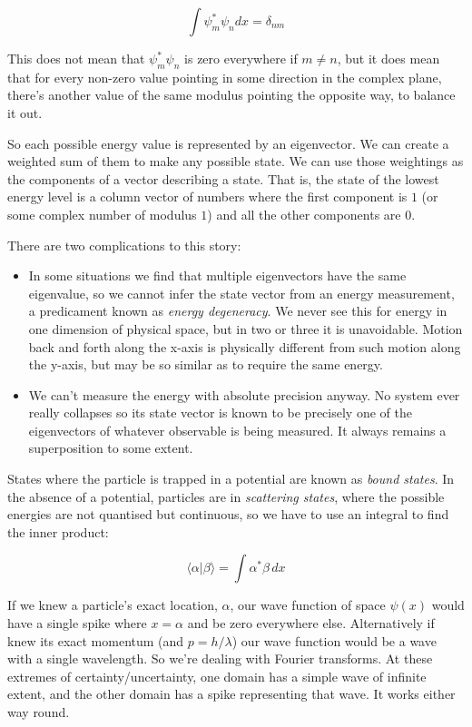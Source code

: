 $$
\int
\psi_m^* \psi_n dx = \delta_{nm}
$$

This does not mean that $\psi_m^* \psi_n$ is zero everywhere if $m \ne n$, but it does mean that for every non-zero value pointing in some direction in the complex plane, there's another value of the same modulus pointing the opposite way, to balance it out.

So each possible energy value is represented by an eigenvector. We can create a weighted sum of them to make any possible state. We can use those weightings as the components of a vector describing a state. That is, the state of the lowest energy level is a column vector of numbers where the first component is $1$ (or some complex number of modulus $1$) and all the other components are $0$.

There are two complications to this story:

\begin{itemize}
  \item In some situations we find that multiple eigenvectors have the same eigenvalue, so we cannot infer the state vector from an energy measurement, a predicament known as \textit{energy degeneracy}. We never see this for energy in one dimension of physical space, but in two or three it is unavoidable. Motion back and forth along the x-axis is physically different from such motion along the y-axis, but may be so similar as to require the same energy.
  \item We can't measure the energy with absolute precision anyway. No system ever really collapses so its state vector is known to be precisely one of the eigenvectors of whatever observable is being measured. It always remains a superposition to some extent.
\end{itemize}

States where the particle is trapped in a potential are known as \textit{bound states}. In the absence of a potential, particles are in \textit{scattering states}, where the possible energies are not quantised but continuous, so we have to use an integral to find the inner product:

$$
\langle \alpha | \beta \rangle
=
\int
\alpha^* \beta \,dx
$$

If we knew a particle's exact location, $\alpha$, our wave function of space $\psi(x)$ would have a single spike where $x = \alpha$ and be zero everywhere else. Alternatively if knew its exact momentum (and $p=h/\lambda$) our wave function would be a wave with a single wavelength. So we're dealing with Fourier transforms. At these extremes of certainty/uncertainty, one domain has a simple wave of infinite extent, and the other domain has a spike representing that wave. It works either way round.

